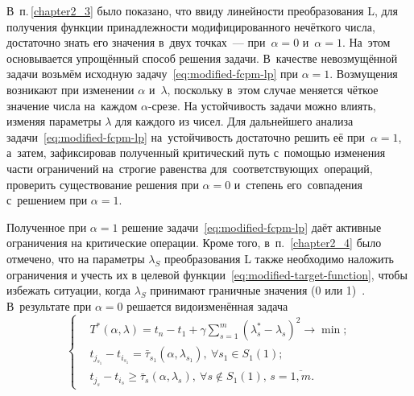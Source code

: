 В~п.\,\ref{chapter2_3} было показано, что ввиду линейности преобразования L, для получения функции принадлежности модифицированного нечёткого числа, достаточно знать его значения в~двух точках~--- при~$\alpha=0$ и~$\alpha=1$. На~этом основывается упрощённый способ решения задачи. В~качестве невозмущённой задачи возьмём исходную задачу~\eqref{eq:modified-fcpm-lp} при $\alpha=1$. Возмущения возникают при изменении $\alpha$ и~$\lambda$, поскольку в~этом случае меняется чёткое значение числа на~каждом $\alpha$-срезе. На устойчивость задачи можно влиять, изменяя параметры $\lambda$ для каждого из чисел. Для дальнейшего анализа задачи~\eqref{eq:modified-fcpm-lp} на~устойчивость достаточно решить её при~$\alpha=1$, а~затем, зафиксировав полученный критический путь с~помощью изменения части ограничений на~строгие равенства для~соответствующих~операций, проверить существование решения при $\alpha=0$ и~степень его~совпадения с~решением при $\alpha=1$.

Полученное при $\alpha=1$ решение задачи~\eqref{eq:modified-fcpm-lp} даёт активные ограничения на критические операции. Кроме того, в~п.~\ref{chapter2_4} было отмечено, что на параметры $\lambda_S$ преобразования L также необходимо наложить ограничения и учесть их в целевой функции~\eqref{eq:modified-target-function}, чтобы избежать ситуации, когда $\lambda_S$ принимают граничные значения (0 или 1)~\cite{Vorontsov_VSTU}. В~результате при $\alpha=0$ решается видоизменённая задача
\begin{equation}
\label{eq:modified-fcpm-lp-alpha}
  \left \{ \begin{aligned}
    & T^* \left(\alpha, \lambda \right) = t_n-t_1+\gamma \sum \limits_{s=1}^{m} \left(\lambda_s^*-\lambda_s \right)^2 \to \min; \\
    & t_{j_{s_1}}-t_{i_{s_1}} = \bar{\tau}_{s_1}\left(\alpha, \lambda_{s_1} \right),\ \forall s_1 \in S_1\left(1\right); \\
    & t_{j_s}-t_{i_s} \geqslant \bar{\tau}_s\left(\alpha, \lambda_s \right),\ \forall s \notin S_1\left(1\right),\,s=\overline{1,m}.
  \end{aligned} \right.
\end{equation}

